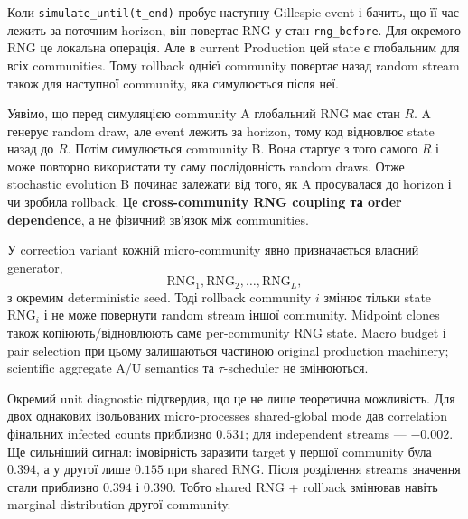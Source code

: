 \documentclass[11pt,a4paper]{article}
\begin{document}
Коли \texttt{simulate\_until(t\_end)} пробує наступну Gillespie event і бачить, що її час лежить за поточним horizon, він повертає RNG у стан \texttt{rng\_before}. Для окремого RNG це локальна операція. Але в current Production цей state є глобальним для всіх communities. Тому rollback однієї community повертає назад random stream також для наступної community, яка симулюється після неї.

\begin{tcolorbox}[colback=soft,colframe=macro,title=Чому з'являється штучна залежність]
Уявімо, що перед симуляцією community A глобальний RNG має стан $R$. A генерує random draw, але event лежить за horizon, тому код відновлює state назад до $R$. Потім симулюється community B. Вона стартує з того самого $R$ і може повторно використати ту саму послідовність random draws. Отже stochastic evolution B починає залежати від того, як A просувалася до horizon і чи зробила rollback. Це \textbf{cross-community RNG coupling та order dependence}, а не фізичний зв'язок між communities.
\end{tcolorbox}

У correction variant кожній micro-community явно призначається власний generator,
\[
\mathrm{RNG}_1,\mathrm{RNG}_2,\ldots,\mathrm{RNG}_L,
\]
з окремим deterministic seed. Тоді rollback community $i$ змінює тільки state $\mathrm{RNG}_i$ і не може повернути random stream іншої community. Midpoint clones також копіюють/відновлюють саме per-community RNG state. Macro budget і pair selection при цьому залишаються частиною original production machinery; scientific aggregate A/U semantics та $\tau$-scheduler не змінюються.

Окремий unit diagnostic підтвердив, що це не лише теоретична можливість. Для двох однакових ізольованих micro-processes shared-global mode дав correlation фінальних infected counts приблизно $0.531$; для independent streams --- $-0.002$. Ще сильніший сигнал: імовірність заразити target у першої community була $0.394$, а у другої лише $0.155$ при shared RNG. Після розділення streams значення стали приблизно $0.394$ і $0.390$. Тобто shared RNG + rollback змінював навіть marginal distribution другої community.
\end{document}
